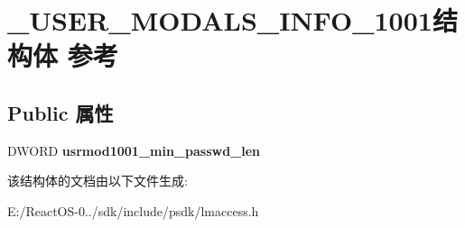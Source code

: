 \hypertarget{struct___u_s_e_r___m_o_d_a_l_s___i_n_f_o__1001}{}\section{\+\_\+\+U\+S\+E\+R\+\_\+\+M\+O\+D\+A\+L\+S\+\_\+\+I\+N\+F\+O\+\_\+1001结构体 参考}
\label{struct___u_s_e_r___m_o_d_a_l_s___i_n_f_o__1001}
\subsection*{Public 属性}
\begin{DoxyCompactItemize}
\item 
\mbox{\label{struct___u_s_e_r___m_o_d_a_l_s___i_n_f_o__1001_aa3b663a35a76168587cb1add1df8480d}} 
D\+W\+O\+RD {\bfseries usrmod1001\+\_\+min\+\_\+passwd\+\_\+len}
\end{DoxyCompactItemize}


该结构体的文档由以下文件生成\+:\begin{DoxyCompactItemize}
\item 
E\+:/\+React\+O\+S-\/0../sdk/include/psdk/lmaccess.\+h\end{DoxyCompactItemize}
